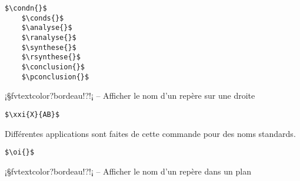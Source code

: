 \documentclass[11pt,a4paper,rgb]{report}
\begin{document}
\colorbox{blue!15}{}
\hfill
\begin{minipage}{.65\textwidth}
	\begin{lstlisting}[linewidth=\textwidth, language={[LaTeX]TeX}]
	$\condn{}$
	$\conds{}$
	$\analyse{}$
	$\ranalyse{}$
	$\synthese{}$
	$\rsynthese{}$
	$\conclusion{}$
	$\pconclusion{}$
	\end{lstlisting}
\end{minipage}

\setlength{\leftskip}{0pt}
\setlength{\textwidth}{18cm}%







\vspace*{.75cm}

\inCodeStub¡§fvtextcolor?bordeau!?!¡ -- Afficher le nom d'un repère sur une droite

\setlength{\leftskip}{.75cm}%
\setlength{\textwidth}{17.25cm}%

\colorbox{blue!15}{}
\hfill
\begin{minipage}{.65\textwidth}
	\begin{lstlisting}[linewidth=\textwidth, language={[LaTeX]TeX}]
	$\xxi{X}{AB}$
	\end{lstlisting}
\end{minipage}

Différentes applications sont faites de cette commande pour des noms standards.

\colorbox{blue!15}{}
\hfill
\begin{minipage}{.65\textwidth}
	\begin{lstlisting}[linewidth=\textwidth, language={[LaTeX]TeX}]
	$\oi{}$
	\end{lstlisting}
\end{minipage}

\setlength{\leftskip}{0pt}
\setlength{\textwidth}{18cm}%


\vspace*{.75cm}

\inCodeStub¡§fvtextcolor?bordeau!?!¡ -- Afficher le nom d'un repère dans un plan

\setlength{\leftskip}{.75cm}%
\setlength{\textwidth}{17.25cm}%
\end{document}
